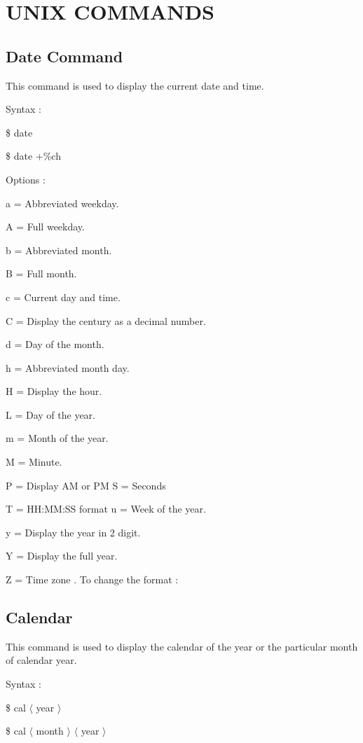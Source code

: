 \section{UNIX COMMANDS}
\subsection{Date Command}
\noindent This command is used to display the current date and time.

\noindent Syntax :

        \$ date 

        \$ date +\%ch
  
\noindent Options :

a = Abbreviated weekday.

A = Full weekday.

b = Abbreviated month.

B = Full month.

c = Current day and time.

C = Display the century as a decimal number.

d = Day of the month.

h = Abbreviated month day.

H = Display the hour.

L = Day of the year.

m = Month of the year.

M = Minute.

P = Display AM or PM S = Seconds

T = HH:MM:SS format u = Week of the year.

y = Display the year in 2 digit.

Y = Display the full year.

Z = Time zone . To change the format :


\subsection{Calendar}
\noindent This command is used to display the calendar of the year or the particular month of calendar year.

\noindent Syntax :

\$ cal $\langle$ year $\rangle$

\$ cal $\langle$ month $\rangle$ $\langle$ year $\rangle$
